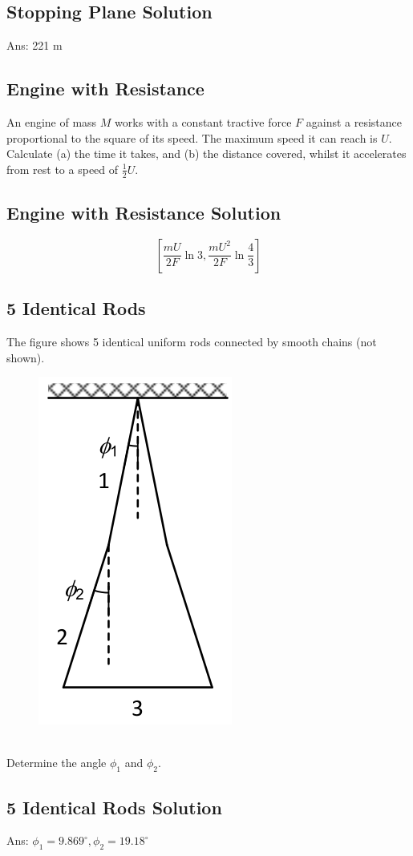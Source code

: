 \documentclass{article}
\begin{document}
\subsection{Stopping Plane Solution}
Ans: 221 m
\clearpage
\subsection{Engine with Resistance}
An engine of mass $M$ works with a constant tractive force $F$ against a resistance proportional to the square of its speed. The maximum speed it can reach is $U$. Calculate
(a) the time it takes, and
(b) the distance covered, whilst it accelerates from rest to a speed of $\frac{1}{2} U$.
\clearpage 
\subsection{Engine with Resistance Solution}
$$
\left[\frac{m U}{2 F} \ln 3, \frac{m U^2}{2 F} \ln \frac{4}{3}\right]
$$
\clearpage
\subsection{5 Identical Rods}
The figure shows 5 identical uniform rods connected by smooth chains (not shown).
\begin{figure}[h]
    \centering
\includegraphics[width=0.4\linewidth]{images/5identicalrods.png}
\end{figure}\\
Determine the angle $\phi_1$ and $\phi_2$.
\clearpage
\subsection{5 Identical Rods Solution}
Ans: $\phi_1=9.869^{\circ}, \phi_2=19.18^{\circ}$
\clearpage
\end{document}
